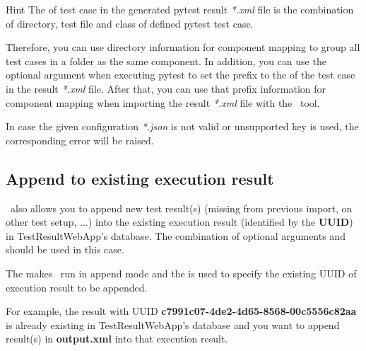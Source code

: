 \begin{itemize}
\begin{itemize}
\begin{itemize}
                \begin{boxhint} {Hint}
                  The  of test case in the generated pytest
                  result \emph{*.xml} file is the combination of directory,
                  test file and class of defined pytest test case.

                  Therefore, you can use directory information for component
                  mapping to group all test cases in a folder as the same component.
                  \newline
                  In addition, you can use the optional argument 
                  when executing pytest to set the prefix to the 
                  of the test case in the result \emph{*.xml} file. After that,
                  you can use that prefix information for component mapping when
                  importing the result \emph{*.xml} file with the \pkg\ tool.
                \end{boxhint}
              \end{itemize}
          \end{itemize}

          In case the given configuration \emph{*.json} is not valid or
          unsupported key is used, the corresponding error will be raised.
      \end{itemize}

  \hypertarget{append-to-existing-execution-result}{%
  \subsection{Append to existing execution result}
  \label{append-to-existing-execution-result}}
    \pkg\ also allows you to append new test result(s) (missing from previous
    import, on other test setup, ...) into the existing execution result
    (identified by the \textbf{UUID}) in TestResultWebApp's database.
    The combination of optional arguments  and
     should be used in this case.

    The  makes \pkg\ run in append mode and the 
    is used to specify the existing UUID of execution result to be appended.

    For example, the result with UUID \textbf{c7991c07-4de2-4d65-8568-00c5556c82aa}
    is already existing in TestResultWebApp's database and you want to append
    result(s) in \textbf{output.xml} into that execution result.

